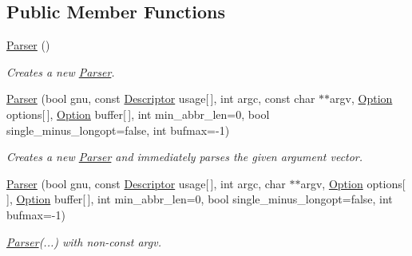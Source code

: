 \subsection*{Public Member Functions}
\begin{DoxyCompactItemize}
\item 
\mbox{\label{classoption_1_1Parser_a895e9a1db19f1a026ee6a7412de17d04}} 
\hyperlink{classoption_1_1Parser_a895e9a1db19f1a026ee6a7412de17d04}{Parser} ()
\begin{DoxyCompactList}\small\item\em Creates a new \hyperlink{classoption_1_1Parser}{Parser}. \end{DoxyCompactList}\item 
\hyperlink{classoption_1_1Parser_aa747e9792c9c08ede32b6c323438db71}{Parser} (bool gnu, const \hyperlink{structoption_1_1Descriptor}{Descriptor} usage\mbox{[}$\,$\mbox{]}, int argc, const char $\ast$$\ast$argv, \hyperlink{classoption_1_1Option}{Option} options\mbox{[}$\,$\mbox{]}, \hyperlink{classoption_1_1Option}{Option} buffer\mbox{[}$\,$\mbox{]}, int min\+\_\+abbr\+\_\+len=0, bool single\+\_\+minus\+\_\+longopt=false, int bufmax=-\/1)
\begin{DoxyCompactList}\small\item\em Creates a new \hyperlink{classoption_1_1Parser}{Parser} and immediately parses the given argument vector. \end{DoxyCompactList}\item 
\mbox{\label{classoption_1_1Parser_a78b4c7d73fff17204dd908b1b167dec9}} 
\hyperlink{classoption_1_1Parser_a78b4c7d73fff17204dd908b1b167dec9}{Parser} (bool gnu, const \hyperlink{structoption_1_1Descriptor}{Descriptor} usage\mbox{[}$\,$\mbox{]}, int argc, char $\ast$$\ast$argv, \hyperlink{classoption_1_1Option}{Option} options\mbox{[}$\,$\mbox{]}, \hyperlink{classoption_1_1Option}{Option} buffer\mbox{[}$\,$\mbox{]}, int min\+\_\+abbr\+\_\+len=0, bool single\+\_\+minus\+\_\+longopt=false, int bufmax=-\/1)
\begin{DoxyCompactList}\small\item\em \hyperlink{classoption_1_1Parser}{Parser}(...) with non-\/const argv. \end{DoxyCompactList}\item 
\mbox{\label{classoption_1_1Parser_ae4100da4b662937ead22484e6cfc7cec}} 

\end{DoxyCompactItemize}
